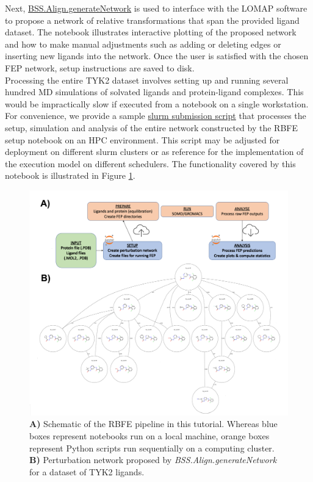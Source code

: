 Next, \href{https://biosimspace.openbiosim.org/api/generated/BioSimSpace.Align.generateNetwork.html}{BSS.Align.generateNetwork} is used to interface with the LOMAP software~\cite{Liu2013} to propose a network of relative transformations that span the provided ligand dataset. The notebook illustrates interactive plotting of the proposed network and how to make manual adjustments such as adding or deleting edges or inserting new ligands into the network. Once the user is satisfied with the chosen FEP network, setup instructions are saved to disk. 
\\
Processing the entire TYK2 dataset involves setting up and running several hundred MD simulations of solvated ligands and protein-ligand complexes. This would be impractically slow if executed from a notebook on a single workstation. For convenience, we provide a sample \href{https://github.com/OpenBioSim/biosimspace_tutorials/blob/main/04_fep/02_RBFE/scripts/run_all_slurm.sh}{slurm submission script} that processes the setup, simulation and analysis of the entire network constructed by the RBFE setup notebook on an HPC environment. This script may be adjusted for deployment on different slurm clusters or as reference for the implementation of the execution model on different schedulers. The functionality covered by this notebook is illustrated in Figure \ref{rbfe_setup_fig}.
\\

\begin{figure}[htp]
\includegraphics[width=\linewidth]{LIVECOMS/04_fep/rbfe-setup.png}
\caption{ \textbf{A)} Schematic of the RBFE pipeline in this tutorial. Whereas blue boxes represent notebooks run on a local machine, orange boxes represent Python scripts run sequentially on a computing cluster.
\textbf{B)} Perturbation network proposed by \emph{BSS.Align.generateNetwork} for a dataset of TYK2 ligands.} 
\label{rbfe_setup_fig}
\end{figure}


